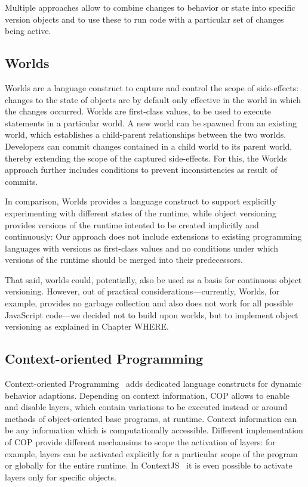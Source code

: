 Multiple approaches allow to combine changes to behavior or state into specific version objects and to use these to run code with a particular set of changes being active.

\subsection{Worlds}

Worlds are a language construct to capture and control the scope of side-effects: changes to the state of objects are by default only effective in the world in which the changes occurred.
Worlds are first-class values, to be used to execute statements in a particular world.
A new world can be spawned from an existing world, which establishes a child-parent relationships between the two worlds.
Developers can commit changes contained in a child world to its parent world, thereby extending the scope of the captured side-effects.
For this, the Worlds approach further includes conditions to prevent inconsistencies as result of commits.

In comparison, Worlds provides a language construct to support explicitly experimenting with different states of the runtime, while object versioning provides versions of the runtime intented to be created implicitly and continuously: Our approach does not include extensions to existing programming languages with versions as first-class values and no conditions under which versions of the runtime should be merged into their predecessors.

That said, worlds could, potentially, also be used as a basis for continuous object versioning.
However, out of practical considerations---currently, Worlds, for example, provides no garbage collection and also does not work for all possible JavaScript code---we decided not to build upon worlds, but to implement object versioning as explained in Chapter WHERE. 



\subsection{Context-oriented Programming}

Context-oriented Programming~\cite{Hirschfeld2008COP} adds dedicated language constructs for dynamic behavior adaptions.
Depending on context information, COP allows to enable and disable layers, which contain variations to be executed instead or around methods of object-oriented base programs, at runtime.
Context information can be any information which is computationally accessible.
Different implementation of COP provide different mechansims to scope the activation of layers: for example, layers can be activated explicitly for a particular scope of the program or globally for the entire runtime.
In ContextJS~\cite{Lincke2011OIC} it is even possible to activate layers only for specific objects.

